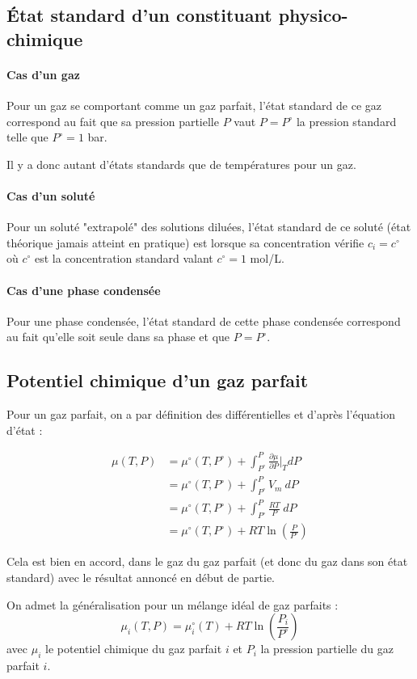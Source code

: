 \documentclass[french]{book}
\theoremstyle{plain}
\theoremstyle{definition}
\theoremstyle{remark}
\begin{document}
\subsection{État standard d'un constituant physico-chimique}
\paragraph{Cas d'un gaz} Pour un gaz se comportant comme un gaz parfait, l'état standard de ce gaz correspond au fait que sa pression partielle $P$ vaut $P=P^\circ$ la pression standard telle que $P^\circ=1$ bar. \\ \par Il y a donc autant d'états standards que de températures pour un gaz. 
\paragraph{Cas d'un soluté} Pour un soluté "extrapolé" des solutions diluées, l'état standard de ce soluté (état théorique jamais atteint en pratique) est lorsque sa concentration vérifie $c_i=c^\circ$ où $c^\circ$ est la concentration standard valant $c^\circ=1$ mol/L.
\paragraph{Cas d'une phase condensée} Pour une phase condensée, l'état standard de cette phase condensée correspond au fait qu'elle soit seule dans sa phase et que $P=P^\circ$.
\subsection{Potentiel chimique d'un gaz parfait}
Pour un gaz parfait, on a par définition des différentielles et d'après l'équation d'état : 
\begin{center}
	\begin{align*}
		\mu(T,P)&=\mu^\circ(T,P^\circ)+\int_{P^\circ}^{P}\frac{\partial \mu}{\partial P}\bigg|_TdP \\
		&= \mu^\circ(T,P^\circ)+\int_{P^\circ}^{P}V_m\ dP \\
		&= \mu^\circ(T,P^\circ)+\int_{P^\circ}^{P}\frac{RT}{P}\ dP \\
		&= \mu^\circ(T,P^\circ)+RT\ln\left(\frac{P}{P^\circ}\right)
	\end{align*}
\end{center}
Cela est bien en accord, dans le gaz du gaz parfait (et donc du gaz dans son état standard) avec le résultat annoncé en début de partie. \\ \par On admet la généralisation pour un mélange idéal de gaz parfaits : $$\mu_i(T,P)=\mu_i^\circ(T)+RT\ln\left(\frac{P_i}{P^\circ}\right)$$ avec $\mu_i$ le potentiel chimique du gaz parfait $i$ et $P_i$ la pression partielle du gaz parfait $i$.
\end{document}
